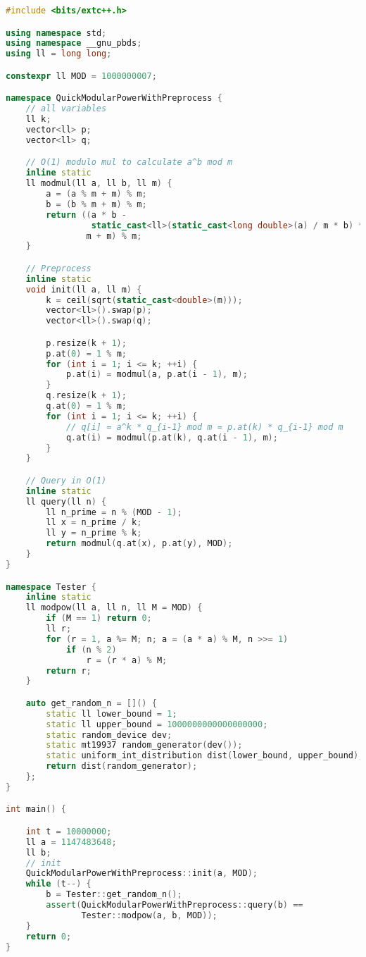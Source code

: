 \documentclass[11pt, letterpaper]{article}
\begin{document}
\renewcommand{\ttdefault}{pcr}
\begin{lstlisting}[language=C++]
#include <bits/extc++.h>

using namespace std;
using namespace __gnu_pbds;
using ll = long long;

constexpr ll MOD = 1000000007;

namespace QuickModularPowerWithPreprocess {
    // all variables
    ll k;
    vector<ll> p;
    vector<ll> q;

    // O(1) modulo mul to calculate a^b mod m
    inline static
    ll modmul(ll a, ll b, ll m) {
        a = (a % m + m) % m;
        b = (b % m + m) % m;
        return ((a * b -
                 static_cast<ll>(static_cast<long double>(a) / m * b) * m) %
                m + m) % m;
    }

    // Preprocess
    inline static
    void init(ll a, ll m) {
        k = ceil(sqrt(static_cast<double>(m)));
        vector<ll>().swap(p);
        vector<ll>().swap(q);

        p.resize(k + 1);
        p.at(0) = 1 % m;
        for (int i = 1; i <= k; ++i) {
            p.at(i) = modmul(a, p.at(i - 1), m);
        }
        q.resize(k + 1);
        q.at(0) = 1 % m;
        for (int i = 1; i <= k; ++i) {
            // q[i] = a^k * q_{i-1} mod m = p.at(k) * q_{i-1} mod m
            q.at(i) = modmul(p.at(k), q.at(i - 1), m);
        }
    }

    // Query in O(1)
    inline static
    ll query(ll n) {
        ll n_prime = n % (MOD - 1);
        ll x = n_prime / k;
        ll y = n_prime % k;
        return modmul(q.at(x), p.at(y), MOD);
    }
}

namespace Tester {
    inline static
    ll modpow(ll a, ll n, ll M = MOD) {
        if (M == 1) return 0;
        ll r;
        for (r = 1, a %= M; n; a = (a * a) % M, n >>= 1)
            if (n % 2)
                r = (r * a) % M;
        return r;
    }

    auto get_random_n = []() {
        static ll lower_bound = 1;
        static ll upper_bound = 1000000000000000000;
        static random_device dev;
        static mt19937 random_generator(dev());
        static uniform_int_distribution dist(lower_bound, upper_bound);
        return dist(random_generator);
    };
}

int main() {

    int t = 10000000;
    ll a = 1147483648;
    ll b;
    // init
    QuickModularPowerWithPreprocess::init(a, MOD);
    while (t--) {
        b = Tester::get_random_n();
        assert(QuickModularPowerWithPreprocess::query(b) ==
               Tester::modpow(a, b, MOD));
    }
    return 0;
}
\end{lstlisting}
\end{document}
